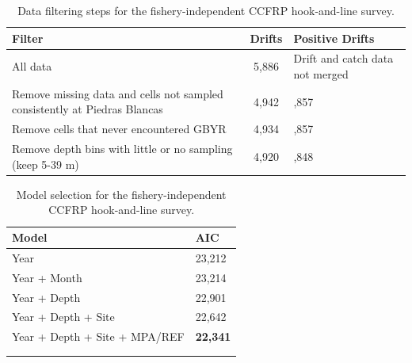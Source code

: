 \documentclass[12pt,]{article}
\begin{document}
\begin{table}[ht]
\centering
\caption{Data filtering steps for the fishery-independent CCFRP hook-and-line survey.} 
\label{tab:Fleet9_Filter}
\begin{tabular}{>{\raggedright}p{3.5in}c>{\centering}p{1.4in}}
  \hline
Filter & Drifts & Positive Drifts \\ 
  \hline
All data & 5,886 & Drift and catch data not merged \\ 
  Remove missing data and cells not sampled consistently at Piedras Blancas & 4,942 & 3,857 \\ 
  Remove cells that never encountered GBYR & 4,934 & 3,857 \\ 
  Remove depth bins with little or no sampling (keep 5-39 m) & 4,920 & 3,848 \\ 
   \hline
\end{tabular}
\end{table}\begin{table}[ht]
\centering
\caption{Model selection for the fishery-independent CCFRP hook-and-line survey.} 
\label{tab:Fleet9_AIC}
\begin{tabular}{ll}
  \hline
Model & AIC \\ 
  \hline
Year & 23,212 \\ 
  Year + Month & 23,214 \\ 
  Year + Depth & 22,901 \\ 
  Year + Depth + Site & 22,642 \\ 
  Year + Depth + Site + MPA/REF & \textbf{22,341} \\ 
   &  \\ 
   &  \\ 
   \hline
\end{tabular}
\end{table}

\FloatBarrier
\end{document}
